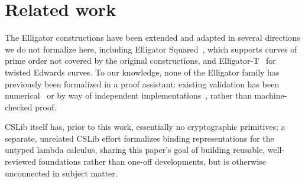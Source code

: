 \section{Related work}
\label{sec:related-work}

The Elligator constructions have been extended and adapted in
several directions we do not formalize here, including Elligator
Squared~\cite{tibouchi2014a}, which supports curves of
prime order not covered by the original constructions, and
Elligator-T~\cite{gourab2026a} for twisted Edwards curves. To
our knowledge, none of the Elligator family has previously been
formalized in a proof assistant: existing validation has been
numerical~\cite{elligatorcryptotests} or by way of independent
implementations~\cite{elligatororg}, rather than machine-checked
proof.

CSLib itself has, prior to this work, essentially no cryptographic
primitives; a separate, unrelated CSLib effort formalizes binding
representations for the untyped lambda calculus, sharing this
paper's goal of building reusable, well-reviewed foundations rather
than one-off developments, but is otherwise unconnected in subject
matter.
